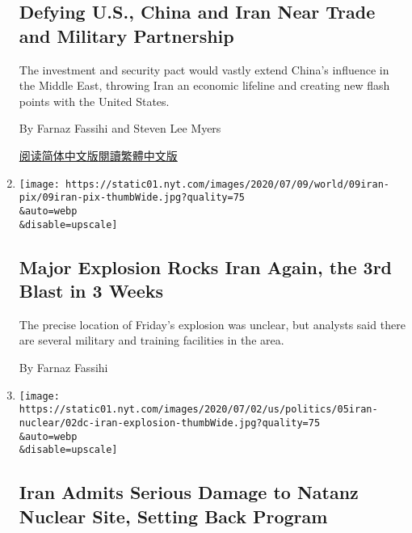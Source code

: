 \begin{enumerate}
  \hypertarget{defying-us-china-and-iran-near-trade-and-military-partnership}{%
  \subsection{Defying U.S., China and Iran Near Trade and Military
  Partnership}\label{defying-us-china-and-iran-near-trade-and-military-partnership}}

  The investment and security pact would vastly extend China's influence
  in the Middle East, throwing Iran an economic lifeline and creating
  new flash points with the United States.

  By Farnaz Fassihi and Steven Lee Myers

  \href{https://cn.nytimes.com/world/20200713/china-iran-trade-military-deal/}{阅读简体中文版}\href{https://cn.nytimes.com/world/20200713/china-iran-trade-military-deal/zh-hant/}{閱讀繁體中文版}
\item
  \href{/2020/07/09/world/middleeast/iran-explosion.html}{}

  \texttt{[image: https://static01.nyt.com/images/2020/07/09/world/09iran-pix/09iran-pix-thumbWide.jpg?quality=75\\\&auto=webp\\\&disable=upscale]}

  \hypertarget{major-explosion-rocks-iran-again-the-3rd-blast-in-3-weeks}{%
  \subsection{Major Explosion Rocks Iran Again, the 3rd Blast in 3
  Weeks}\label{major-explosion-rocks-iran-again-the-3rd-blast-in-3-weeks}}

  The precise location of Friday's explosion was unclear, but analysts
  said there are several military and training facilities in the area.

  By Farnaz Fassihi
\item
  \href{/2020/07/05/world/middleeast/iran-Natanz-nuclear-damage.html}{}

  \texttt{[image: https://static01.nyt.com/images/2020/07/02/us/politics/05iran-nuclear/02dc-iran-explosion-thumbWide.jpg?quality=75\\\&auto=webp\\\&disable=upscale]}

  \hypertarget{iran-admits-serious-damage-to-natanz-nuclear-site-setting-back-program}{%
  \subsection{Iran Admits Serious Damage to Natanz Nuclear Site, Setting
  Back
  Program}\label{iran-admits-serious-damage-to-natanz-nuclear-site-setting-back-program}}


\end{enumerate}
